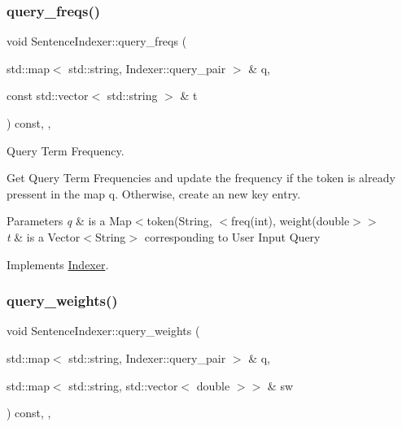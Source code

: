 \subsubsection{\texorpdfstring{query\+\_\+freqs()}{query\_freqs()}}
{\footnotesize\ttfamily void Sentence\+Indexer\+::query\+\_\+freqs (\begin{DoxyParamCaption}\item[{std\+::map$<$ std\+::string, Indexer\+::query\+\_\+pair $>$ \&}]{q,  }\item[{const std\+::vector$<$ std\+::string $>$ \&}]{t }\end{DoxyParamCaption}) const\hspace{0.3cm}{\ttfamily [override]}, {\ttfamily [private]}, {\ttfamily [virtual]}}



Query Term Frequency. 

Get Query Term Frequencies and update the frequency if the token is already pressent in the map q. Otherwise, create an new key entry.


\begin{DoxyParams}{Parameters}
{\em q} & is a Map$<$token(String, $<$freq(int), weight(double$>$$>$ \\
\hline
{\em t} & is a Vector$<$\+String$>$ corresponding to User Input Query \\
\hline
\end{DoxyParams}


Implements \hyperlink{class_indexer_a0587f6a4d61620219473bf583ecdbad5}{Indexer}.

\mbox{\label{class_sentence_indexer_ad3835aaf2ff4a59fff85d596dfc95d5c}} 
\subsubsection{\texorpdfstring{query\+\_\+weights()}{query\_weights()}}
{\footnotesize\ttfamily void Sentence\+Indexer\+::query\+\_\+weights (\begin{DoxyParamCaption}\item[{std\+::map$<$ std\+::string, Indexer\+::query\+\_\+pair $>$ \&}]{q,  }\item[{std\+::map$<$ std\+::string, std\+::vector$<$ double $>$$>$ \&}]{sw }\end{DoxyParamCaption}) const\hspace{0.3cm}{\ttfamily [override]}, {\ttfamily [private]}, {\ttfamily [virtual]}}



